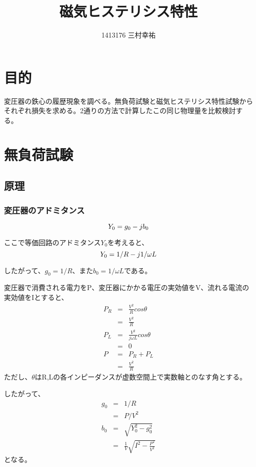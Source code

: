 \documentclass[11pt,a4j]{jsarticle}
\title{磁気ヒステリシス特性}
\author{1413176 三村幸祐}
\date{2016/6/16 \and 2016/6/23}
\begin{document}
  
  
 \section{目的}
  変圧器の鉄心の履歴現象を調べる。無負荷試験と磁気ヒステリシス特性試験からそれぞれ損失を求める。2通りの方法で計算したこの同じ物理量を比較検討する。
  
 \section{無負荷試験}
 
  \subsection{原理}
   \subsubsection{変圧器のアドミタンス}
   \begin{equation}
    Y_0 = g_0 -jb_0 \\
   \end{equation}
   
    ここで等価回路のアドミタンス$Y_0$を考えると、
    \begin{equation}
    Y_0 = 1/R - j 1/{\omega L} \\
   \end{equation}
  
   したがって、$g_0 = 1/R$、また$b_0 = 1/{\omega L}$である。

   変圧器で消費される電力をP、変圧器にかかる電圧の実効値をV、流れる電流の実効値をIとすると、
   \begin{eqnarray}
    P_R &=& \frac{V^2}{R} cos\theta \nonumber \\
        &=& \frac{V^2}{R} \nonumber \\
    P_L &=& \frac{V^2}{j\omega L} cos\theta \nonumber \\
        &=& 0 \nonumber \\
    P   &=& P_R + P_L \nonumber \\
        &=& \frac{V^2}{R}
   \end{eqnarray}
   ただし、$\theta$はR,Lの各インピーダンスが虚数空間上で実数軸とのなす角とする。

   したがって、
   \begin{eqnarray}
    g_0 &=& 1/R \nonumber \\
        &=& P/V^2 \\
    b_0 &=& \sqrt{Y_0^2 - g_0^2} \nonumber \\ 
        &=& \frac{1}{V} \sqrt{I^2 - \frac{P^2}{V^2}} 
   \end{eqnarray}
   となる。
   
\end{document}
